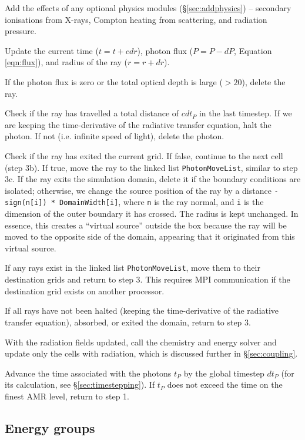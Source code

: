 \documentclass[useAMS,usenatbib]{mn2e}
\begin{document}
 Add the effects of any optional physics modules
(\S\ref{sec:addphysics}) -- secondary ionisations from X-rays, Compton
heating from scattering, and radiation pressure.

 Update the current time ($t = t + cdr$), photon flux ($P = P
- dP$, Equation \ref{eqn:flux}), and radius of the ray ($r = r + dr$).

 If the photon flux is zero or the total optical depth is
large ($>20$), delete the ray.

 Check if the ray has travelled a total distance of $c dt_P$
in the last timestep.  If we are keeping the time-derivative of the
radiative transfer equation, halt the photon.  If not (i.e. infinite
speed of light), delete the photon.

 Check if the ray has exited the current grid.  If false,
continue to the next cell (step 3b).  If true, move the ray to the
linked list \texttt{PhotonMoveList}, similar to step 3c.  If the ray
exits the simulation domain, delete it if the boundary conditions are
isolated; otherwise, we change the source position of the ray by a
distance \texttt{-sign(n[i]) * DomainWidth[i]}, where \texttt{n} is
the ray normal, and \texttt{i} is the dimension of the outer boundary
it has crossed.  The radius is kept unchanged.  In essence, this
creates a ``virtual source'' outside the box because the ray will be
moved to the opposite side of the domain, appearing that it originated
from this virtual source.

 If any rays exist in the linked list \texttt{PhotonMoveList},
move them to their destination grids and return to step 3.  This
requires MPI communication if the destination grid exists on another
processor.

 If all rays have not been halted (keeping the time-derivative
of the radiative transfer equation), absorbed, or exited the domain,
return to step 3.

 With the radiation fields updated, call the chemistry and
energy solver and update only the cells with radiation, which is
discussed further in \S\ref{sec:coupling}.

 Advance the time associated with the photons $t_P$ by the
global timestep $dt_P$ (for its calculation, see
\S\ref{sec:timestepping}).  If $t_P$ does not exceed the time on the
finest AMR level, return to step 1.

\subsection{Energy groups}
\end{document}
